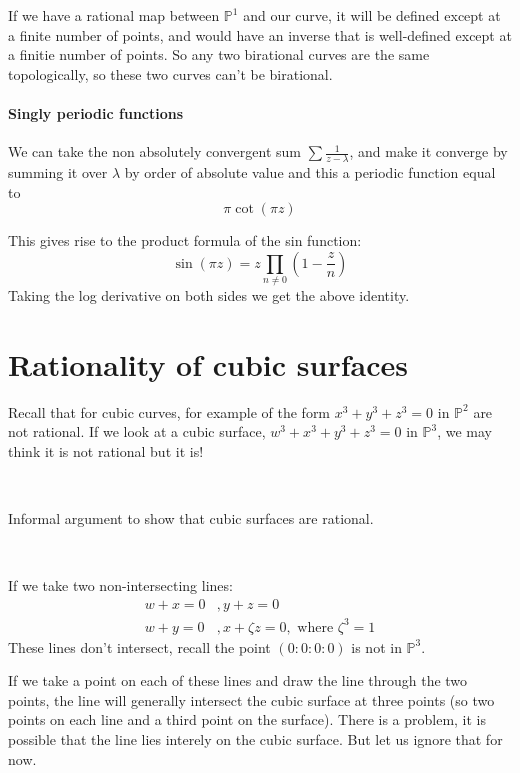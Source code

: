 If we have a rational map between $\mathbb{P}^1$ and our curve, it will be defined except at a finite number of points, and would have an inverse that is well-defined except at a finitie number of points. So any two birational curves are the same topologically, so these two curves can't be birational.

\paragraph*{Singly periodic functions}

We can take the non absolutely convergent sum $\sum \frac{1}{z-\lambda}$, and make it converge by summing it over $\lambda$ by order of absolute value and this a periodic function equal to \[\pi \cot(\pi z)\]

This gives rise to the product formula of the sin function:\begin{equation*}
    \sin (\pi z) = z\prod_{n\neq 0}(1-\frac{z}{n})
\end{equation*}
Taking the log derivative on both sides we get the above identity.

\section{Rationality of cubic surfaces}

Recall that for cubic curves, for example of the form $x^3+y^3 + z^3 = 0$ in $\mathbb{P}^2$ are not rational. If we look at a cubic surface, $w^3+x^3+y^3+z^3 = 0$ in $\mathbb{P}^3$, we may think it is not rational but it is!

\

Informal argument to show that cubic surfaces are rational.

\

If we take two non-intersecting lines:\begin{align*} \tag{$\dagger$}
    w+x = 0&, y+z = 0\\
    w+y = 0&, x+\zeta z = 0, \text{ where }\zeta^3 = 1
\end{align*}
These lines don't intersect, recall the point $(0\colon 0\colon 0\colon 0)$ is not in $\mathbb{P}^3$.

If we take a point on each of these lines and draw the line through the two points, the line will generally intersect the cubic surface at three points (so two points on each line and a third point on the surface). There is a problem, it is possible that the line lies interely on the cubic surface. But let us ignore that for now.

